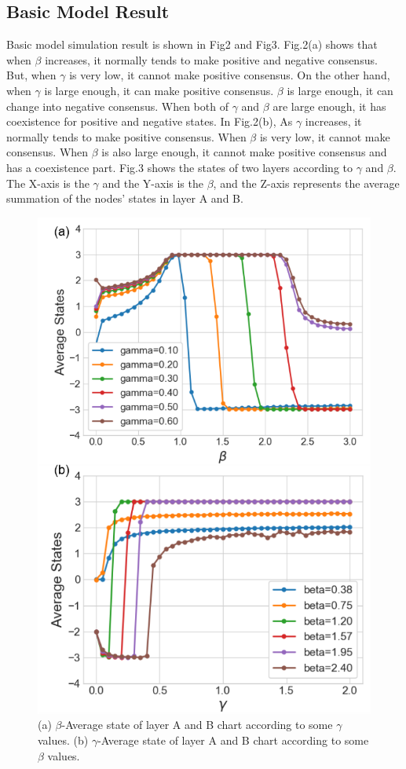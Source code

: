 \documentclass[english]{cccconf}
\begin{document}
\subsection{Basic Model Result}
Basic model simulation result is shown in Fig2 and Fig3. Fig.2(a) shows that when $\beta$ increases, it normally tends to make positive and negative consensus. But, when $\gamma$ is very low, it cannot make positive consensus. On the other hand, when $\gamma$ is large enough, it can make positive consensus. $\beta$ is large enough, it can change into negative consensus. When both of $\gamma$ and $\beta$ are large enough, it has coexistence for positive and negative states.
In Fig.2(b), As $\gamma$ increases, it normally tends to make positive consensus. When $\beta$ is very low, it cannot make consensus. When $\beta$ is also large enough, it cannot make positive consensus and has a coexistence part.
Fig.3 shows the states of two layers according to $\gamma$ and $\beta$. The X-axis is the $\gamma$ and the Y-axis is the $\beta$, and the Z-axis represents the average summation of the nodes' states in layer A and B.
\begin{figure}[!htb]
  \centering
  \includegraphics[width=\hsize]{FIG2.png}
  \caption{(a) $\beta$-Average state of layer A and B chart according to some $\gamma$ values. (b) $\gamma$-Average state of layer A and B chart according to some $\beta$ values.}
  \label{Fig2}
\end{figure}
\end{document}

